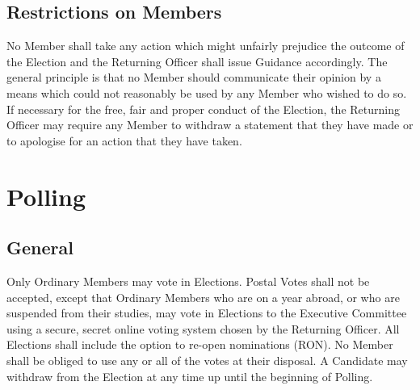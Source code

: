 \subsection{Restrictions on Members}
\npara No Member shall take any action which might unfairly prejudice the outcome of the Election and the Returning Officer shall issue Guidance accordingly.  The general principle is that no Member should communicate their opinion by a means which could not reasonably be used by any Member who wished to do so.
\npara If necessary for the free, fair and proper conduct of the Election, the Returning Officer may require any Member to withdraw a statement that they have made or to apologise for an action that they have taken. 
\section{Polling}
\subsection{General}
\npara Only Ordinary Members may vote in Elections.
\npara Postal Votes shall not be accepted, except that Ordinary Members who are on a year abroad, or who are suspended from their studies, may vote in Elections to the Executive Committee using a secure, secret online voting system chosen by the Returning Officer.
\npara All Elections shall include the option to re-open nominations (RON).
\npara No Member shall be obliged to use any or all of the votes at their disposal.
\npara A Candidate may withdraw from the Election at any time up until the beginning of Polling.
